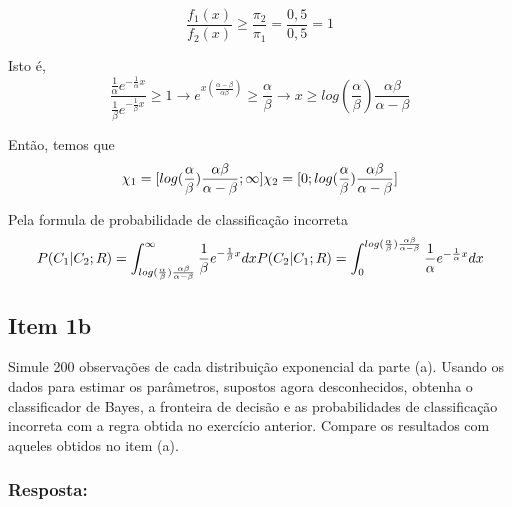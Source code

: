 \documentclass[
]{article}
\begin{document}
\begin{equation}
\frac{f_1(x)}{f_2(x)} \geq \frac{\pi_2}{\pi_1} = \frac{0,5}{0,5} = 1
\end{equation}

Isto é, \begin{equation}
\frac{\frac{1}{\alpha} e^{-\frac{1}{\alpha} x}}{\frac{1}{\beta}e^{-\frac{1}{\beta} x}} \geq 1 \longrightarrow
e^{x(\frac{\alpha - \beta}{\alpha\beta})} \geq \frac{\alpha}{\beta} \longrightarrow
x \geq log(\frac{\alpha}{\beta})\frac{\alpha \beta}{\alpha-\beta}
\end{equation}

Então, temos que \begin{equation}
\chi_1 = [log(\frac{\alpha}{\beta})\frac{\alpha \beta}{\alpha-\beta}; \infty] \\
\chi_2 = [0;log(\frac{\alpha}{\beta})\frac{\alpha \beta}{\alpha-\beta}] \\

\end{equation}

Pela formula de probabilidade de classificação incorreta
\begin{equation}
P(C_1 | C_2; R) = \int^\infty_{log(\frac{\alpha}{\beta})\frac{\alpha \beta}{\alpha-\beta}}\frac{1}{\beta}e^{-\frac{1}{\beta} x}dx \\
P(C_2 | C_1; R) = \int^{log(\frac{\alpha}{\beta})\frac{\alpha \beta}{\alpha-\beta}}_{0}\frac{1}{\alpha} e^{-\frac{1}{\alpha} x}dx  \\


\end{equation}

\hypertarget{item-1b}{%
\subsection{Item 1b}\label{item-1b}}

Simule 200 observações de cada distribuição exponencial da parte (a).
Usando os dados para estimar os parâmetros, supostos agora
desconhecidos, obtenha o classificador de Bayes, a fronteira de decisão
e as probabilidades de classificação incorreta com a regra obtida no
exercício anterior. Compare os resultados com aqueles obtidos no item
(a).

\hypertarget{resposta-1}{%
\subsubsection{Resposta:}\label{resposta-1}}
\end{document}
